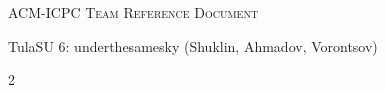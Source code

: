 \documentclass[a4paper, 10pt]{extarticle}
\begin{document}
\thispagestyle{fancy}

\begin{center}
	\Huge\textsc{ACM-ICPC Team Reference Document}

	\huge TulaSU 6: underthesamesky (Shuklin, Ahmadov, Vorontsov)

	\vspace{0.50cm}
\end{center}

\begin{multicols*}{2}
    \tableofcontents

    \setcounter{page}{1}
    
\end{multicols*}



%
%	
\end{document}

